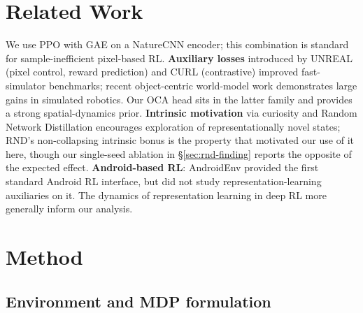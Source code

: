 \documentclass{article}
\begin{document}
\section{Related Work}
\label{sec:related}

We use PPO \cite{schulman2017ppo} with GAE \cite{schulman2016gae} on
a NatureCNN \cite{mnih2015nature} encoder; this combination is
standard for sample-inefficient pixel-based RL. \textbf{Auxiliary
losses} introduced by UNREAL \cite{jaderberg2017unreal} (pixel
control, reward prediction) and CURL \cite{laskin2020curl}
(contrastive) improved fast-simulator benchmarks; recent
object-centric world-model work
\cite{ferraro2024focus,zhang2025ocstorm} demonstrates large gains
in simulated robotics. Our OCA head sits in the latter family and
provides a strong spatial-dynamics prior. \textbf{Intrinsic
motivation} via curiosity \cite{pathak2017curiosity} and Random
Network Distillation \cite{burda2018rnd} encourages exploration of
representationally novel states; RND's non-collapsing intrinsic
bonus is the property that motivated our use of it here, though
our single-seed ablation in \S\ref{sec:rnd-finding} reports the
opposite of the expected effect.
\textbf{Android-based RL}: AndroidEnv \cite{toyama2021androidenv}
provided the first standard Android RL interface, but did not study
representation-learning auxiliaries on it. The dynamics of
representation learning in deep RL more generally \cite{lyle2022what}
inform our analysis.

\section{Method}
\label{sec:method}

\subsection{Environment and MDP formulation}
\label{sec:env}
\end{document}

